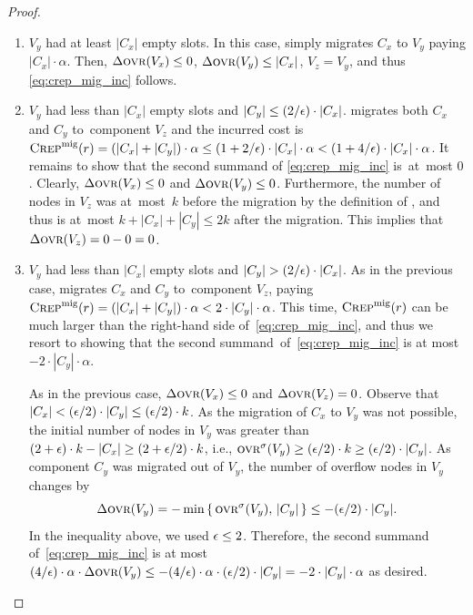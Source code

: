 \begin{proof}
\begin{enumerate}
\item 
$V_y$ had at least $|C_x|$ empty slots. In this case, \CREP simply migrates
$C_x$ to $V_y$ paying $|C_x| \cdot \alpha$. Then, $\Delta \textsc{ovr}(V_x) \leq 0$,
$\Delta \textsc{ovr}(V_y) \leq |C_x|$, $V_z = V_y$, and thus \eqref{eq:crep_mig_inc}
follows.

\item 
$V_y$ had less than $|C_x|$ empty slots and $|C_y| \leq (2/\epsilon) \cdot |C_x|$.
\CREP migrates both $C_x$ and $C_y$ to~component $V_z$ and the incurred cost is 
$\textsc{Crep}^\textnormal{mig}(r) = (|C_x| + |C_y|) \cdot \alpha \leq (1+2/\epsilon) \cdot |C_x| \cdot \alpha
< (1 + 4/\epsilon) \cdot |C_x| \cdot \alpha$. 
It remains to show that the second summand of \eqref{eq:crep_mig_inc} is~at~most $0$. 
Clearly, $\Delta \textsc{ovr}(V_x) \leq 0$ and $\Delta \textsc{ovr}(V_y) \leq 0$. 
Furthermore, the number of 
nodes in $V_z$ was at~most~$k$ before the migration by the definition of \CREP,
and thus is at~most $k + |C_x| + |C_y| \leq 2k$ after the migration.
This implies that $\Delta \textsc{ovr}(V_z) = 0 - 0 = 0$.

\item 
$V_y$ had less than $|C_x|$ empty slots and $|C_y| > (2/\epsilon) \cdot |C_x|$.
As in the previous case, \CREP migrates $C_x$ and $C_y$ to~component $V_z$, 
paying $\textsc{Crep}^\textnormal{mig}(r) = (|C_x| + |C_y|) \cdot \alpha < 2 \cdot |C_y| \cdot \alpha$.
This time, $\textsc{Crep}^\textnormal{mig}(r)$ can be much larger than the right-hand side 
of~\eqref{eq:crep_mig_inc}, and thus we resort to showing that 
the second summand~of~\eqref{eq:crep_mig_inc} is at most $ - 2 \cdot |C_y| \cdot \alpha$.

As in the previous case, $\Delta \textsc{ovr}(V_x) \leq 0$ and $\Delta \textsc{ovr}(V_z) = 0$. 
Observe that $|C_x| < (\epsilon / 2) \cdot |C_y| \leq (\epsilon / 2) \cdot k$.
As the migration of $C_x$ to $V_y$ was not possible, the initial number
of nodes in $V_y$ was greater than $(2 + \epsilon) \cdot k - |C_x| \geq (2+\epsilon/2) \cdot k$,
i.e., $\textsc{ovr}^\sigma(V_y) \geq (\epsilon/2) \cdot k \geq (\epsilon/2) \cdot |C_y|$. 
As component $C_y$ was migrated out of $V_y$, the number of overflow nodes in $V_y$ changes by
\[
	\Delta \textsc{ovr}(V_y) 
		= - \min \left\{ \,\textsc{ovr}^\sigma(V_y), \,|C_y| \,\right\}
		\leq - (\epsilon/2) \cdot |C_y|.
\]
In the inequality above, we used $\epsilon \leq 2$.
Therefore, the second summand of~\eqref{eq:crep_mig_inc} is at most 
$(4/\epsilon) \cdot \alpha \cdot \Delta\textsc{ovr}(V_y) \leq - 
(4/\epsilon) \cdot \alpha \cdot (\epsilon/2) \cdot |C_y|
= - 2 \cdot |C_y| \cdot \alpha$ as desired.
\end{enumerate}
\end{proof}

